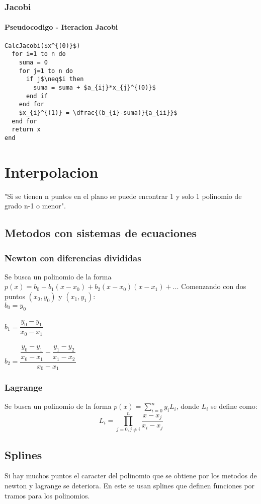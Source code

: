 \documentclass[11pt]{article}
\begin{document}
\subsubsection{Jacobi}
\paragraph{Pseudocodigo - Iteracion Jacobi\\}
\begin{lstlisting}[frame=single, mathescape=true]
CalcJacobi($x^{(0)}$)
  for i=1 to n do
    suma = 0
    for j=1 to n do
      if j$\neq$i then
        suma = suma + $a_{ij}*x_{j}^{(0)}$
      end if
    end for
    $x_{i}^{(1)} = \dfrac{(b_{i}-suma)}{a_{ii}}$
  end for
  return x
end
\end{lstlisting}  

\newpage
\section{Interpolacion}
"Si se tienen n puntos en el plano se puede encontrar 1 y solo 1 polinomio de grado n-1 o menor".
\subsection{Metodos con sistemas de ecuaciones}
\subsubsection{Newton con diferencias divididas}
Se busca un polinomio de la forma $p(x) = b_{0}+b_{1}(x-x_{0})+b_{2}(x-x_{0})(x-x_{1}) + ...$
Comenzando con dos puntos $(x_{0},y_{0})$ y $(x_{1},y_{1})$:\\
$b_{0} = y_{0}$\\\\
$b_{1} = \dfrac{y_{0}-y_{1}}{x_{0}-x_{1}}$\\\\
$b_{2} = \dfrac{\dfrac{y_{0}-y_{1}}{x_{0}-x_{1}}-\dfrac{y_{1}-y_{2}}{x_{1}-x_{2}}}{x_{0}-x_{1}}$

\subsubsection{Lagrange}
Se busca un polinomio de la forma $p(x) = \sum_{i=0}^{n} y_{i}L_{i}$, donde $L_{i}$ se define como:
\[ L_{i} = \prod_{j=0, j \neq i}^{n} \dfrac{x-x_{j}}{x_{i}-x_{j}}            \]
\subsection{Splines}
Si hay muchos puntos el caracter del polinomio que se obtiene por los metodos de newton y lagrange se deteriora. En este se usan splines que definen funciones por tramos para los polinomios.
\end{document}
